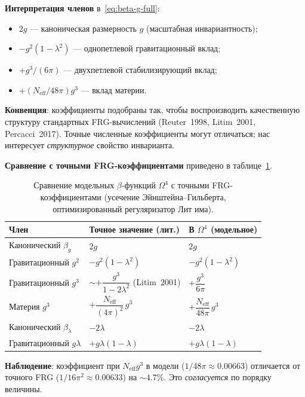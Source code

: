 \documentclass[11pt,a4paper]{article}
\newcommand{\Om}{\ensuremath{\Omega^4}}
\theoremstyle{definition}
\begin{document}
\medskip\noindent
\textbf{Интерпретация членов} в~\eqref{eq:beta-g-full}:
\begin{itemize}
    \item $2g$ --- каноническая размерность $g$ (масштабная инвариантность);
    \item $-g^2(1-\lambda^2)$ --- однопетлевой гравитационный вклад;
    \item $+g^3/(6\pi)$ --- двухпетлевой стабилизирующий вклад;
    \item $+(N_{\text{eff}}/48\pi)g^3$ --- вклад материи.
\end{itemize}

\medskip\noindent
\textbf{Конвенция}: коэффициенты подобраны так, чтобы
воспроизводить качественную структуру стандартных
FRG-вычислений (Reuter~1998, Litim~2001, Percacci~2017).
Точные численные коэффициенты могут отличаться; нас интересует
\emph{структурное} свойство инварианта.

\medskip\noindent
\textbf{Сравнение с точными FRG-коэффициентами}
приведено в таблице~\ref{tab:frg-coeff-comparison}.

\begin{table}[ht]
\centering
\caption{Сравнение модельных \texorpdfstring{$\beta$}{}-функций \texorpdfstring{$\Om$}{}
с точными FRG-коэффициентами (усечение Эйнштейна--Гильберта,
оптимизированный регуляризатор Лит има).}
\label{tab:frg-coeff-comparison}
\begin{tabular}{p{3cm}p{4cm}p{4cm}}
\toprule
Член & Точное значение (лит.) & В $\Om$ (модельное) \\
\midrule
Канонический $\beta_g$ & $2g$ & $2g$ \\
Гравитационный $g^2$ & $-g^2(1-\lambda^2)$ &
    $-g^2(1-\lambda^2)$ \\
Гравитационный $g^3$ &
    $\sim +\dfrac{g^3}{1-2\lambda^2}$ (Litim~2001) &
    $+\dfrac{g^3}{6\pi}$ \\[0.5em]
Материя $g^3$ &
    $+\dfrac{N_{\text{eff}}}{(4\pi)^2}\,g^3$ &
    $+\dfrac{N_{\text{eff}}}{48\pi}\,g^3$ \\[0.5em]
Канонический $\beta_\lambda$ & $-2\lambda$ & $-2\lambda$ \\
Гравитационный $g\lambda$ & $+g\lambda(1-\lambda)$ &
    $+g\lambda(1-\lambda)$ \\
\bottomrule
\end{tabular}
\end{table}

\medskip\noindent
\textbf{Наблюдение}: коэффициент при $N_{\text{eff}} g^3$
в модели ($1/48\pi \approx 0.00663$) отличается от
точного FRG ($1/16\pi^2 \approx 0.00633$) на $\sim 4.7\%$.
Это \emph{согласуется} по порядку величины.
\end{document}
